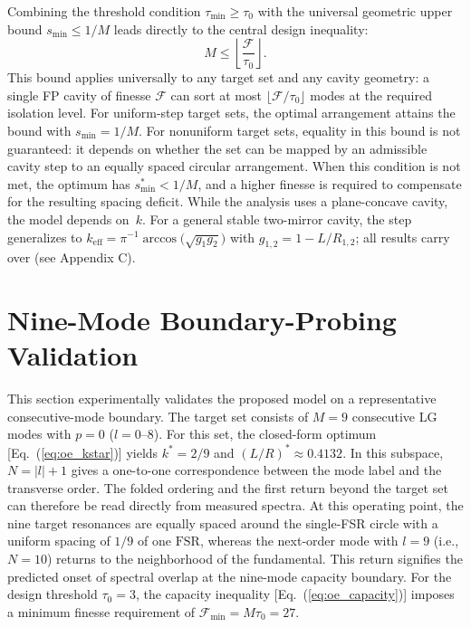 \documentclass{optica-article}
\begin{document}
Combining the threshold condition $\tau_{\min}\ge\tau_0$ with the universal geometric upper bound $s_{\min}\le 1/M$ leads directly to the central design inequality:
\begin{equation}
M \le \left\lfloor \frac{\mathcal{F}}{\tau_0}\right\rfloor.
\label{eq:oe_capacity}
\end{equation}
This bound applies universally to any target set and any cavity geometry: a single FP cavity of finesse $\mathcal{F}$ can sort at most $\lfloor\mathcal{F}/\tau_0\rfloor$ modes at the required isolation level. For uniform-step target sets, the optimal arrangement attains the bound with $s_{\min}=1/M$. For nonuniform target sets, equality in this bound is not guaranteed: it depends on whether the set can be mapped by an admissible cavity step to an equally spaced circular arrangement. When this condition is not met, the optimum has $s_{\min}^*<1/M$, and a higher finesse is required to compensate for the resulting spacing deficit. While the analysis uses a plane-concave cavity, the model depends on~$k$. For a general stable two-mirror cavity, the step generalizes to $k_{\mathrm{eff}}=\pi^{-1}\arccos\!\bigl(\sqrt{g_1 g_2}\bigr)$ with $g_{1,2}=1-L/R_{1,2}$; all results carry over (see Appendix C).
\section{Nine-Mode Boundary-Probing Validation}

This section experimentally validates the proposed model on a representative consecutive-mode boundary. The target set consists of $M=9$ consecutive LG modes with $p=0$ ($l=0$--$8$). For this set, the closed-form optimum [Eq.~(\ref{eq:oe_kstar})] yields $k^*=2/9$ and $(L/R)^*\approx 0.4132$. In this subspace, $N=|l|+1$ gives a one-to-one correspondence between the mode label and the transverse order. The folded ordering and the first return beyond the target set can therefore be read directly from measured spectra. At this operating point, the nine target resonances are equally spaced around the single-FSR circle with a uniform spacing of $1/9$ of one $\mathrm{FSR}$, whereas the next-order mode with $l=9$ (i.e., $N=10$) returns to the neighborhood of the fundamental. This return signifies the predicted onset of spectral overlap at the nine-mode capacity boundary. For the design threshold $\tau_0=3$, the capacity inequality [Eq.~(\ref{eq:oe_capacity})] imposes a minimum finesse requirement of $\mathcal{F}_{\min}=M\tau_0=27$.
\end{document}
